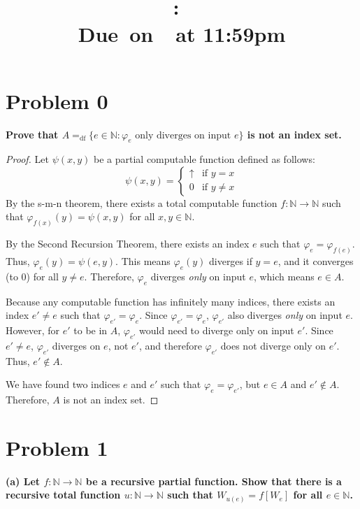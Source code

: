 \documentclass{article}
\title{
    \vspace{2in}
    \textmd{\textbf{\hmwkClass:\ \hmwkTitle}}\\
    \normalsize\vspace{0.1in}\small{Due\ on\ \hmwkDueDate\ at 11:59pm}\\
    \vspace{0.1in}\large{\hmwkClassInstructor}
    \vspace{3in}
}
\author{\hmwkAuthorName}
\date{}
\begin{document}
\maketitle

\pagebreak
    \section*{Problem 0}
\textbf{Prove that $A =_{\text{df}} \{e \in \mathbb{N} : \varphi_e \text{ only diverges on input } e\}$ is not an index set.}

\begin{proof}
Let $\psi(x, y)$ be a partial computable function defined as follows:
\[
\psi(x, y) = 
\begin{cases} 
\uparrow & \text{if } y = x \\
0 & \text{if } y \neq x 
\end{cases}
\]
By the s-m-n theorem, there exists a total computable function $f: \mathbb{N} \to \mathbb{N}$ such that $\varphi_{f(x)}(y) = \psi(x, y)$ for all $x, y \in \mathbb{N}$.

By the Second Recursion Theorem, there exists an index $e$ such that $\varphi_e = \varphi_{f(e)}$. 
Thus, $\varphi_e(y) = \psi(e, y)$. This means $\varphi_e(y)$ diverges if $y = e$, and it converges (to 0) for all $y \neq e$. Therefore, $\varphi_e$ diverges \textit{only} on input $e$, which means $e \in A$.

Because any computable function has infinitely many indices, there exists an index $e' \neq e$ such that $\varphi_{e'} = \varphi_e$. 
Since $\varphi_{e'} = \varphi_e$, $\varphi_{e'}$ also diverges \textit{only} on input $e$. 
However, for $e'$ to be in $A$, $\varphi_{e'}$ would need to diverge only on input $e'$. Since $e' \neq e$, $\varphi_{e'}$ diverges on $e$, not $e'$, and therefore $\varphi_{e'}$ does not diverge only on $e'$. Thus, $e' \notin A$.

We have found two indices $e$ and $e'$ such that $\varphi_e = \varphi_{e'}$, but $e \in A$ and $e' \notin A$. Therefore, $A$ is not an index set.
\end{proof}

\hrulefill

\section*{Problem 1}
\textbf{(a) Let $f: \mathbb{N} \to \mathbb{N}$ be a recursive partial function. Show that there is a recursive total function $u: \mathbb{N} \to \mathbb{N}$ such that $W_{u(e)} = f[W_e]$ for all $e \in \mathbb{N}$.}
\end{document}
